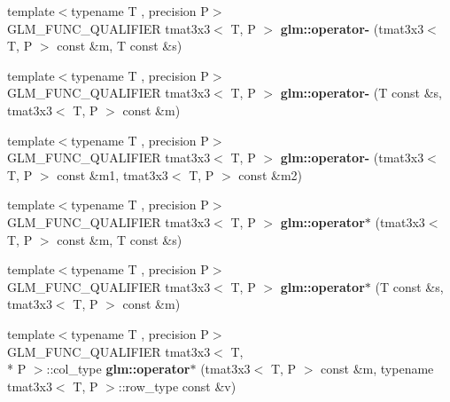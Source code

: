 \begin{DoxyCompactItemize}
\item 
\hypertarget{namespaceglm_a8fe341a49041df12c3bb638cf4393de1}{{\footnotesize template$<$typename T , precision P$>$ }\\G\-L\-M\-\_\-\-F\-U\-N\-C\-\_\-\-Q\-U\-A\-L\-I\-F\-I\-E\-R tmat3x3$<$ T, P $>$ {\bfseries glm\-::operator-\/} (tmat3x3$<$ T, P $>$ const \&m, T const \&s)}\label{namespaceglm_a8fe341a49041df12c3bb638cf4393de1}

\item 
\hypertarget{namespaceglm_ab8b4a9c6d56bba75263467d6eaaa67a0}{{\footnotesize template$<$typename T , precision P$>$ }\\G\-L\-M\-\_\-\-F\-U\-N\-C\-\_\-\-Q\-U\-A\-L\-I\-F\-I\-E\-R tmat3x3$<$ T, P $>$ {\bfseries glm\-::operator-\/} (T const \&s, tmat3x3$<$ T, P $>$ const \&m)}\label{namespaceglm_ab8b4a9c6d56bba75263467d6eaaa67a0}

\item 
\hypertarget{namespaceglm_aca1e701a0f64422be768b08ce5891ae0}{{\footnotesize template$<$typename T , precision P$>$ }\\G\-L\-M\-\_\-\-F\-U\-N\-C\-\_\-\-Q\-U\-A\-L\-I\-F\-I\-E\-R tmat3x3$<$ T, P $>$ {\bfseries glm\-::operator-\/} (tmat3x3$<$ T, P $>$ const \&m1, tmat3x3$<$ T, P $>$ const \&m2)}\label{namespaceglm_aca1e701a0f64422be768b08ce5891ae0}

\item 
\hypertarget{namespaceglm_af6b4a4108004c9cb558cc38403c34598}{{\footnotesize template$<$typename T , precision P$>$ }\\G\-L\-M\-\_\-\-F\-U\-N\-C\-\_\-\-Q\-U\-A\-L\-I\-F\-I\-E\-R tmat3x3$<$ T, P $>$ {\bfseries glm\-::operator$\ast$} (tmat3x3$<$ T, P $>$ const \&m, T const \&s)}\label{namespaceglm_af6b4a4108004c9cb558cc38403c34598}

\item 
\hypertarget{namespaceglm_ae05b82e27e29a3c38c3489379a30500b}{{\footnotesize template$<$typename T , precision P$>$ }\\G\-L\-M\-\_\-\-F\-U\-N\-C\-\_\-\-Q\-U\-A\-L\-I\-F\-I\-E\-R tmat3x3$<$ T, P $>$ {\bfseries glm\-::operator$\ast$} (T const \&s, tmat3x3$<$ T, P $>$ const \&m)}\label{namespaceglm_ae05b82e27e29a3c38c3489379a30500b}

\item 
\hypertarget{namespaceglm_a063060eed26a69cbc69ffd13b78263fd}{{\footnotesize template$<$typename T , precision P$>$ }\\G\-L\-M\-\_\-\-F\-U\-N\-C\-\_\-\-Q\-U\-A\-L\-I\-F\-I\-E\-R tmat3x3$<$ T, \\*
P $>$\-::col\-\_\-type {\bfseries glm\-::operator$\ast$} (tmat3x3$<$ T, P $>$ const \&m, typename tmat3x3$<$ T, P $>$\-::row\-\_\-type const \&v)}\label{namespaceglm_a063060eed26a69cbc69ffd13b78263fd}


\end{DoxyCompactItemize}
